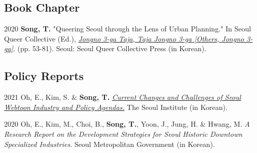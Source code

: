\documentclass[12pt,letterpaper]{report}
\begin{document}
    \subsection*{Book Chapter}
    \begin{tablist}
        \item[2020] \tab{}\textbf{Song, T.} "Queering Seoul through the Lens of Urban Planning." In Seoul Queer Collective (Ed.), \emph{\href{http://www.kyobobook.co.kr/product/detailViewKor.laf?ejkGb=KOR&mallGb=KOR&barcode=9791197096501}{Jongno 3-ga Taja, Taja Jongno 3-ga [Others, Jongno 3-ga]}}. (pp. 53-81). Seoul: Seoul Queer Collective Press (in Korean).
    \end{tablist}
    \subsection*{Policy Reports}
    \begin{tablist}
        \item[2021] \tab{}Oh, E., Kim, S. \& \textbf{Song, T.} \emph{\href{http://global.si.re.kr/content/current-changes-and-challenges-seoul-webtoon-industry-and-policy-agendas}{Current Changes and Challenges of Seoul Webtoon Industry and Policy Agendas.}} The Seoul Institute (in Korean).
        \item[2020] \tab{}Oh, E., Kim, M., Choi, B., \textbf{Song, T.}, Yoon, J., Jung, H. \& Hwang, M. \emph{A Research Report on the Development Strategies for Seoul Historic Downtown Specialized Industries.} Seoul Metropolitan Government (in Korean).
    \end{tablist}
\end{document}
